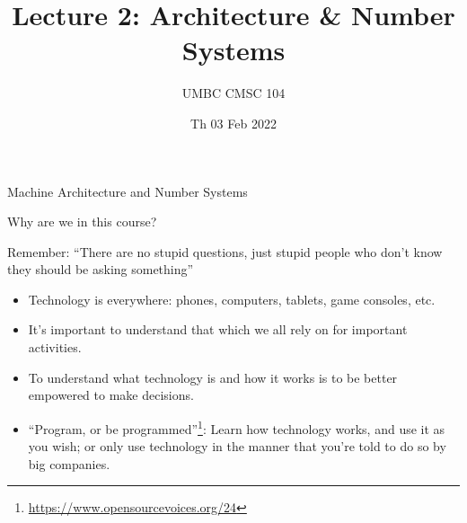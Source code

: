 \documentclass[graphics]{beamer}
\title{Lecture 2: Architecture \& Number Systems}
\author{UMBC CMSC 104}
\date{Th 03 Feb 2022}
\begin{document}
\begin{frame}{}
\centering
    Machine Architecture and Number Systems
\end{frame}

\frame{\tableofcontents}

\begin{frame}{Why are we in this course?}
     {
        
        \newline
        Remember: ``There are no stupid questions, just stupid people who don't know they should be asking something''
    }
     {
        \begin{itemize}
            \item Technology is everywhere: phones, computers, tablets, game consoles, etc.
            \item It's important to understand that which we all rely on for important activities.
            \item To understand what technology is and how it works is to be better empowered to make decisions.
            \item ``Program, or be programmed''\footnote{\url{https://www.opensourcevoices.org/24}}: Learn how technology works, and use it as you wish; or only use technology in the manner that you're told to do so by big companies.
        \end{itemize}
    }
\end{frame}

\end{document}
